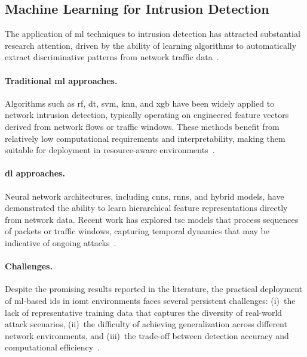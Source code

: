 \subsection{Machine Learning for Intrusion Detection}
\label{subsec:ml-ids}

The application of \gls{ml} techniques to intrusion detection has attracted substantial research attention, driven by the ability of learning algorithms to automatically extract discriminative patterns from network traffic data~\cite{ahmad2021network, sarker2021ml}.

\paragraph{Traditional \gls{ml} approaches.} Algorithms such as \gls{rf}, \gls{dt}, \gls{svm}, \gls{knn}, and \gls{xgb} have been widely applied to network intrusion detection, typically operating on engineered feature vectors derived from network flows or traffic windows. These methods benefit from relatively low computational requirements and interpretability, making them suitable for deployment in resource-aware environments~\cite{heidari2023iot}.

\paragraph{\Gls{dl} approaches.} Neural network architectures, including \glspl{cnn}, \glspl{rnn}, and hybrid models, have demonstrated the ability to learn hierarchical feature representations directly from network data. Recent work has explored \gls{tsc} models that process sequences of packets or traffic windows, capturing temporal dynamics that may be indicative of ongoing attacks~\cite{lopez2025nprint}.

\paragraph{Challenges.} Despite the promising results reported in the literature, the practical deployment of \gls{ml}-based \gls{ids} in \gls{iomt} environments faces several persistent challenges: (i)~the lack of representative training data that captures the diversity of real-world attack scenarios, (ii)~the difficulty of achieving generalization across different network environments, and (iii)~the trade-off between detection accuracy and computational efficiency~\cite{domenech2025evaluating}.

